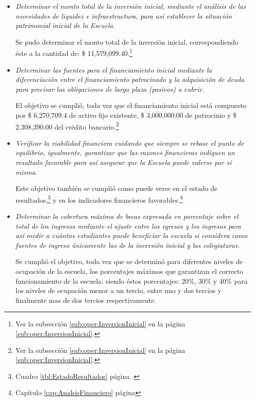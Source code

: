 \begin{itemize}
	\item \emph{Determinar el monto total de la inversión inicial, mediante el análisis de las necesidades de liquidez e infraestructura, para así establecer la situación patrimonial inicial de la Escuela.}
	
		Se pudo determinar el monto total de la inversión inicial, correspondiendo éste a la cantidad de: \$ 11,579,099.40.\footnote{Ver la subsección \ref{sub:oper:InversionInicial} en la página \ref{sub:oper:InversionInicial}.}

	\item \emph{Determinar las fuentes para el financiamiento inicial mediante la diferenciación entre el financiamiento patrocinado y la adquisición de deuda para precisar las obligaciones de largo plazo (pasivos) a cubrir.}

		El objetivo se cumplió, toda vez que el financiamiento inicial está compuesto por \$ 6,270,709.4 de activo fijo existente, \$ 3,000.000.00 de patrocinio y \$ 2,308,390.00 del crédito bancario.\footnote{Ver la subsección \ref{sub:oper:InversionInicial} en la página \ref{sub:oper:InversionInicial}.}

	\item \emph{Verificar la viabilidad financiera cuidando que siempre se rebase el punto de equilibrio, igualmente, garantizar que las razones financieras indiquen un resultado favorable para así asegurar que la Escuela puede \emph{valerse por sí misma}}.

		Este objetivo también se cumplió como puede verse en el estado de resultados,\footnote{Cuadro \ref{tbl:EstadoResultados} página \pageref{tbl:EstadoResultados}.} y en los indicadores financieros favorables.\footnote{Capítulo \ref{cap:AnalsisFinanciero} página \pageref{cap:AnalsisFinanciero}}

	\item \emph{Determinar la cobertura máxima de becas expresada en porcentaje sobre el total de los ingresos mediante el ajuste entre los egresos y los ingresos para así medir a cuántos estudiantes puede beneficiar la escuela si considera como fuentes de ingreso únicamente las de la inversión inicial y las colegiaturas.}

		Se cumplió el objetivo, toda vez que se determinó para diferentes niveles de ocupación de la escuela, los porcentajes máximos que garantizan el correcto funcionamiento de la escuela; siendo éstos porcentajes: 20\%, 30\% y 40\% para los niveles de ocupación menor a un tercio, entre uno y dos tercios y finalmente mas de dos tercios respectivamente.


\end{itemize}
